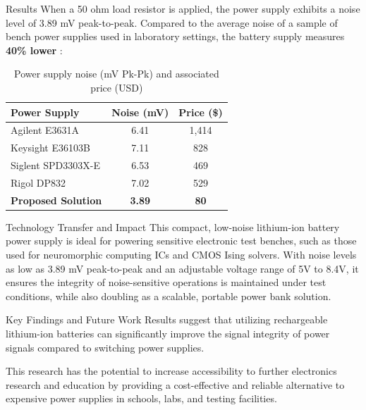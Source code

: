 \documentclass[final]{beamer}
\newlength{\colwidth}
\begin{document}
\begin{frame}[t]
\begin{columns}[t]
\begin{column}{\colwidth}
\begin{block}{Results}
					When a 50 ohm load resistor is applied, the power supply exhibits a noise
					level of 3.89 mV peak-to-peak. Compared to the average noise of a sample of bench power
					supplies used in laboratory settings, the battery supply measures \textbf{
					40\% lower }:

					\begin{table}
						\centering
						\begin{tabular}{lcc}
							\toprule Power Supply      & Noise (mV)    & Price (\$)  \\
							\midrule Agilent E3631A    & 6.41          & 1,414       \\
							Keysight E36103B           & 7.11          & 828         \\
							Siglent SPD3303X-E         & 6.53          & 469         \\
							Rigol DP832                & 7.02          & 529         \\
							\textbf{Proposed Solution} & \textbf{3.89} & \textbf{80} \\
							\bottomrule
						\end{tabular}
						\caption{Power supply noise (mV Pk-Pk) and associated price (USD)}
					\end{table}
				\end{block}

				\begin{block}{Technology Transfer and Impact}
					This compact, low-noise lithium-ion battery power supply is ideal for
					powering sensitive electronic test benches, such as those used for neuromorphic
					computing ICs and CMOS Ising solvers. With noise levels as low as 3.89
					mV peak-to-peak and an adjustable voltage range of 5V to 8.4V, it
					ensures the integrity of noise-sensitive operations is maintained under test conditions, while also doubling as a scalable, portable power bank solution.
				\end{block}

				\begin{block}{Key Findings and Future Work}
					Results suggest that utilizing rechargeable lithium-ion batteries can significantly
					improve the signal integrity of power signals compared to switching power
					supplies.

					This research has the potential to increase accessibility to further electronics
					research and education by providing a cost-effective and reliable alternative
					to expensive power supplies in schools, labs, and testing facilities.


\end{block}
\end{column}
\end{columns}
\end{frame}
\end{document}
